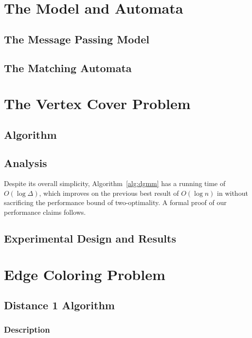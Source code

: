 \documentclass[twoside]{article}
\begin{document}
\section{The Model and Automata}
\label{sec:framework}
\subsection{The Message Passing Model}

\subsection{The Matching Automata}


\section{The Vertex Cover Problem}
\subsection{Algorithm}


\subsection{Analysis}
\label{ssb:algorithms-dgmm-performance}

Despite its overall simplicity, Algorithm~\ref{alg:dgmm} has a running time of $O(\log \Delta)$, which improves on the previous best result of $O(\log n)$ in \cite{1582746} without sacrificing the performance bound of two-optimality. A formal proof of our performance claims follows.



\subsection{Experimental Design and Results}



\section{Edge Coloring Problem}
\label{sec:edge-coloring-problems}
\subsection{Distance 1 Algorithm}
\subsubsection{Description}


\end{document}
